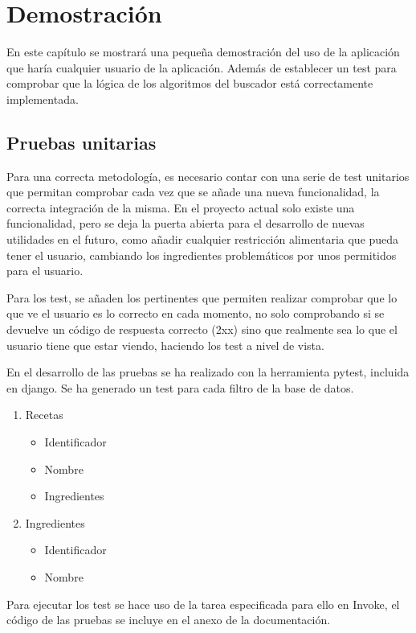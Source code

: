 \chapter{Demostración}
En este capítulo se mostrará una pequeña demostración del uso de la aplicación que haría cualquier usuario de la aplicación. Además de establecer un test para comprobar que la lógica de los algoritmos del buscador está correctamente implementada.

\section{Pruebas unitarias}
Para una correcta metodología, es necesario contar con una serie de test unitarios que permitan comprobar cada vez que se añade una nueva funcionalidad, la correcta integración de la misma. En el proyecto actual solo existe una funcionalidad, pero se deja la puerta abierta para el desarrollo de nuevas utilidades en el futuro, como añadir cualquier restricción alimentaria que pueda tener el usuario, cambiando los ingredientes problemáticos por unos permitidos para el usuario. 

Para los test, se añaden los pertinentes que permiten realizar comprobar que lo que ve el usuario es lo correcto en cada momento, no solo comprobando si se devuelve un código de respuesta correcto (2xx) sino que realmente sea lo que el usuario tiene que estar viendo, haciendo los test a nivel de vista.

En el desarrollo de las pruebas se ha realizado con la herramienta pytest, incluida en \Gls{django}. Se ha generado un \gls{test} para cada filtro de la base de datos.
\begin{enumerate}
    \item Recetas
    \begin{itemize}
        \item Identificador
        \item Nombre
        \item Ingredientes
    \end{itemize}
    \item Ingredientes
    \begin{itemize}
        \item Identificador
        \item Nombre
    \end{itemize}
\end{enumerate}

Para ejecutar los \gls{test} se hace uso de la tarea especificada para ello en Invoke, el código de las pruebas se incluye en el anexo de la documentación. 

